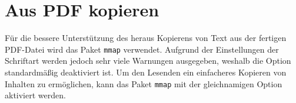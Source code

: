 
\section{Aus PDF kopieren}
Für die bessere Unterstützung des heraus Kopierens von Text aus der fertigen PDF-Datei wird das Paket \texttt{mmap} verwendet. Aufgrund der Einstellungen der Schriftart werden jedoch sehr viele Warnungen ausgegeben, weshalb die Option standardmäßig deaktiviert ist. Um den Lesenden ein einfacheres Kopieren von Inhalten zu ermöglichen, kann das Paket \texttt{mmap} mit der gleichnamigen Option aktiviert werden.

